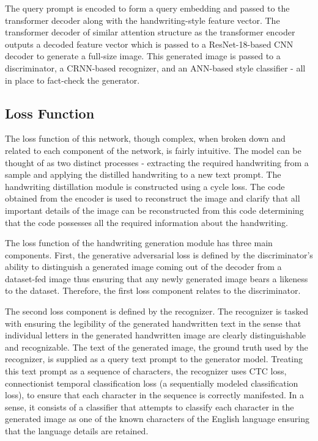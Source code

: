 \documentclass[10pt,twocolumn,letterpaper]{article}
\begin{document}
The query prompt is encoded to form a query embedding and passed to the transformer decoder along with the handwriting-style feature vector. The transformer decoder of similar attention structure as the transformer encoder outputs a decoded feature vector which is passed to a ResNet-18-based CNN decoder to generate a full-size image. This generated image is passed to a discriminator, a CRNN-based recognizer, and an ANN-based style classifier - all in place to fact-check the generator.

\subsection{Loss Function}

The loss function of this network, though complex, when broken down and related to each component of the network, is fairly intuitive. The model can be thought of as two distinct processes - extracting the required handwriting from a sample and applying the distilled handwriting to a new text prompt. The handwriting distillation module is constructed using a cycle loss. The code obtained from the encoder is used to reconstruct the image and clarify that all important details of the image can be reconstructed from this code determining that the code possesses all the required information about the handwriting.

The loss function of the handwriting generation module has three main components. First, the generative adversarial loss is defined by the discriminator's ability to distinguish a generated image coming out of the decoder from a dataset-fed image thus ensuring that any newly generated image bears a likeness to the dataset. Therefore, the first loss component relates to the discriminator.

The second loss component is defined by the recognizer. The recognizer is tasked with ensuring the legibility of the generated handwritten text in the sense that individual letters in the generated handwritten image are clearly distinguishable and recognizable. The text of the generated image, the ground truth used by the recognizer, is supplied as a query text prompt to the generator model. Treating this text prompt as a sequence of characters, the recognizer uses CTC loss, connectionist temporal classification loss (a sequentially modeled classification loss), to ensure that each character in the sequence is correctly manifested. In a sense, it consists of a classifier that attempts to classify each character in the generated image as one of the known characters of the English language ensuring that the language details are retained.
\end{document}
